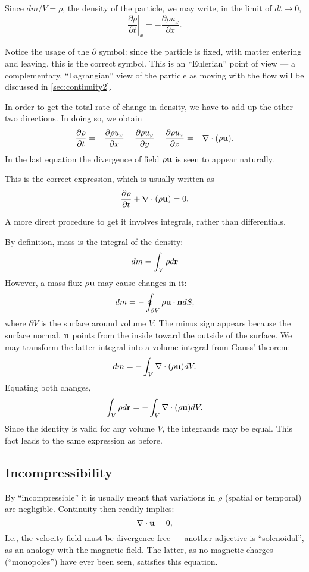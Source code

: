 Since $dm/V=\rho$, the density of the particle, we may write, in the
limit of $dt\to 0$,
\[
\left. \frac{\partial \rho}{\partial t} \right|_x =
-\frac{\partial  \rho  u_x}{\partial x} .
\]

Notice the usage of the $\partial$ symbol: since the particle is
fixed, with matter entering and leaving, this is the correct
symbol. This is an ``Eulerian'' point of view --- a complementary,
``Lagrangian'' view of the particle as moving with the flow will be
discussed in \ref{sec:continuity2}.

In order to get the total rate of change in density, we have to
add up the other two directions. In doing so, we obtain
\begin{equation}
  \label{eq:continuity0}
  \frac{\partial \rho}{\partial t} =
  -\frac{\partial  \rho  u_x}{\partial x}
    -\frac{\partial  \rho  u_y}{\partial y}
    -\frac{\partial  \rho  u_z}{\partial z}  =
    -\nabla\cdot ( \rho  \mathbf{u}) .
\end{equation}
In the last equation the divergence of field $ \rho \mathbf{u}$ is
seen to appear naturally.

This is the correct expression, which is usually written as
\begin{equation}
  \label{eq:continuity}
  \frac{\partial \rho }{\partial t} +  \nabla \cdot (\rho \mathbf{u} ) = 0 .
\end{equation}


A more direct procedure to get it involves integrals, rather
than differentials.

By definition, mass is the integral of the density:
\[
d m = \int_V \rho d\mathbf{r}
\]
However, a mass flux $\rho\mathbf{u}$ may cause changes in it:
\[
d m = - \oint_{\partial V} \rho \mathbf{u} \cdot \mathbf{n} dS ,
\]
where $\partial V$ is the surface around volume $V$. The minus sign
appears because the surface normal, $\mathbf{n}$ points from the inside
toward the outside of the surface. We may transform the latter
integral into a volume integral from Gauss' theorem:
\[
d m = - \int_V \nabla\cdot (\rho \mathbf{u} ) dV .
\]
Equating both changes,
\[
\int_V \rho d\mathbf{r} = - \int_V \nabla\cdot (\rho \mathbf{u} ) dV .
\]
Since the identity is valid for any volume $V$, the integrands may
be equal. This fact leads to the same expression as before.


\subsection{Incompressibility}

By ``incompressible'' it is usually meant that variations in $\rho$
(spatial or temporal) are negligible. Continuity then readily implies:
\[
\nabla \cdot  \mathbf{u}  = 0 ,
\]
I.e., the velocity field must be divergence-free --- another adjective
is ``solenoidal'', as an analogy with the magnetic field. The latter,
as no magnetic charges (``monopoles'') have ever been seen, satisfies
this equation.

